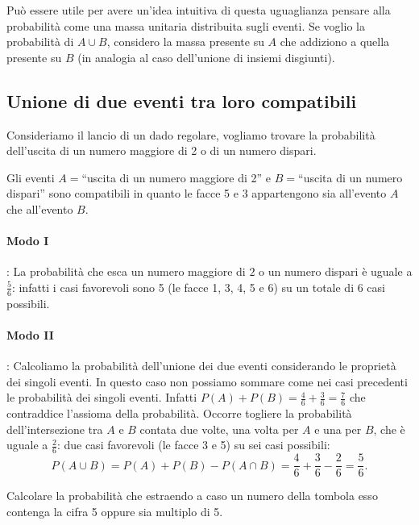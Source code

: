 Può essere utile per avere un'idea intuitiva di questa uguaglianza pensare alla probabilità come una massa unitaria distribuita sugli eventi. Se voglio la probabilità di $A\cup B$, considero la massa presente su $A$ che addiziono a quella presente su $B$ (in analogia al caso dell'unione di insiemi disgiunti).

\subsection{Unione di due eventi tra loro compatibili}

\begin{exrig}
\begin{esempio}
Consideriamo il lancio di un dado regolare, vogliamo trovare la probabilità dell'uscita di un numero maggiore di 2 o di un numero dispari.

Gli eventi $A=$``uscita di un numero maggiore di 2'' e $B=$``uscita di un numero dispari'' sono compatibili in quanto le facce 5 e 3 appartengono sia all'evento $A$ che all'evento $B$.
\begin{center}
 
\end{center}
\paragraph{Modo I}: La probabilità che esca un numero maggiore di $2$ o un numero dispari è uguale a $\frac 5 6$: infatti i casi favorevoli sono 5 (le facce 1, 3, 4, 5 e 6) su un totale di $6$ casi possibili.
\paragraph{Modo II}: Calcoliamo la probabilità dell'unione dei due eventi considerando le proprietà dei singoli eventi. In questo caso non possiamo sommare come nei casi precedenti le probabilità dei singoli eventi. Infatti $P(A)+P(B)=\frac 4 6+\frac 3 6=\frac 7 6$ che contraddice l'assioma della probabilità. Occorre togliere la probabilità dell'intersezione tra $A$ e $B$ contata due volte, una volta per $A$ e una per $B$, che è uguale a $\frac 2 6$: due casi favorevoli (le facce 3 e 5) su sei casi possibili: \[P(A\cup B)=P(A)+P(B)-P(A\cap B)=\frac 4 6+\frac 3 6-\frac 2 6=\frac 5 6.\]
\end{esempio}

\begin{esempio}
Calcolare la probabilità che estraendo a caso un numero della tombola esso contenga la cifra 5 oppure sia multiplo di 5.


\end{esempio}
\end{exrig}
